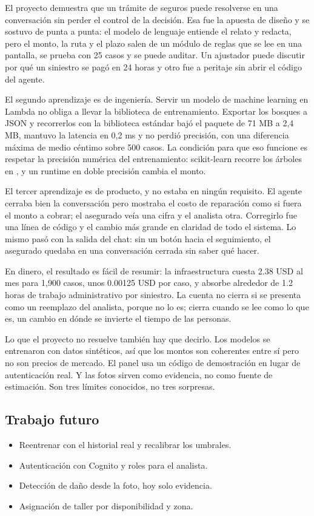 \documentclass[12pt,letterpaper]{article}
\newcommand{\code}[1]{\texttt{\detokenize{#1}}}
\begin{document}
El proyecto demuestra que un trámite de seguros puede resolverse en una conversación sin
perder el control de la decisión. Esa fue la apuesta de diseño y se sostuvo de punta a
punta: el modelo de lenguaje entiende el relato y redacta, pero el monto, la ruta y el
plazo salen de un módulo de reglas que se lee en una pantalla, se prueba con 25 casos y se
puede auditar. Un ajustador puede discutir por qué un siniestro se pagó en 24 horas y otro
fue a peritaje sin abrir el código del agente.

El segundo aprendizaje es de ingeniería. Servir un modelo de machine learning en Lambda no
obliga a llevar la biblioteca de entrenamiento. Exportar los bosques a JSON y recorrerlos
con la biblioteca estándar bajó el paquete de 71 MB a 2,4 MB, mantuvo la latencia en 0,2 ms
y no perdió precisión, con una diferencia máxima de medio céntimo sobre 500 casos. La
condición para que eso funcione es respetar la precisión numérica del entrenamiento:
scikit-learn recorre los árboles en \code{float32}, y un runtime en doble precisión cambia
el monto.

El tercer aprendizaje es de producto, y no estaba en ningún requisito. El agente cerraba
bien la conversación pero mostraba el costo de reparación como si fuera el monto a cobrar;
el asegurado veía una cifra y el analista otra. Corregirlo fue una línea de código y el
cambio más grande en claridad de todo el sistema. Lo mismo pasó con la salida del chat: sin
un botón hacia el seguimiento, el asegurado quedaba en una conversación cerrada sin saber
qué hacer.

En dinero, el resultado es fácil de resumir: la infraestructura cuesta 2.38 USD al mes para
1,900 casos, unos 0.00125 USD por caso, y absorbe alrededor de 1.2 horas de trabajo
administrativo por siniestro. La cuenta no cierra si se presenta como un reemplazo del
analista, porque no lo es; cierra cuando se lee como lo que es, un cambio en dónde se
invierte el tiempo de las personas.

Lo que el proyecto no resuelve también hay que decirlo. Los modelos se entrenaron con datos
sintéticos, así que los montos son coherentes entre sí pero no son precios de mercado. El
panel usa un código de demostración en lugar de autenticación real. Y las fotos sirven como
evidencia, no como fuente de estimación. Son tres límites conocidos, no tres sorpresas.

\subsection*{Trabajo futuro}

\begin{itemize}[itemsep=1pt, topsep=2pt, leftmargin=*]
  \item Reentrenar con el historial real y recalibrar los umbrales.
  \item Autenticación con Cognito y roles para el analista.
  \item Detección de daño desde la foto, hoy solo evidencia.
  \item Asignación de taller por disponibilidad y zona.
\end{itemize}
\end{document}
